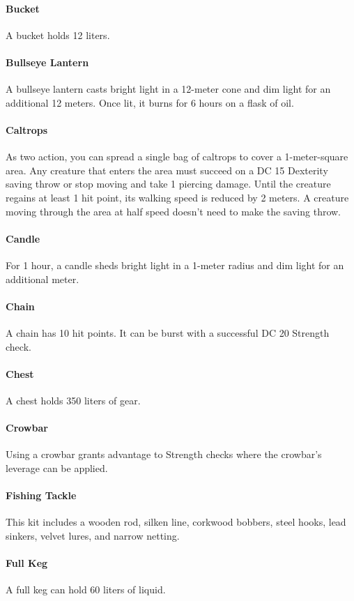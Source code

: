     \paragraph{Bucket}
        A bucket holds 12 liters.
    \paragraph{Bullseye Lantern}
        A bullseye lantern casts bright light in a 12-meter cone and dim light for an additional 12 meters.
        Once lit, it burns for 6 hours on a flask of oil.
    \paragraph{Caltrops}
        As two action, you can spread a single bag of caltrops to cover a 1-meter-square area.
        Any creature that enters the area must succeed on a DC 15 Dexterity saving throw or stop moving and take 1 piercing damage.
        Until the creature regains at least 1 hit point, its walking speed is reduced by 2 meters.
        A creature moving through the area at half speed doesn't need to make the saving throw.
    \paragraph{Candle}
        For 1 hour, a candle sheds bright light in a 1-meter radius and dim light for an additional meter.
    \paragraph{Chain}
        A chain has 10 hit points.
        It can be burst with a successful DC 20 Strength check.
    \paragraph{Chest}
        A chest holds 350 liters of gear.
    \paragraph{Crowbar}
        Using a crowbar grants advantage to Strength checks where the crowbar's leverage can be applied.
    \paragraph{Fishing Tackle}
        This kit includes a wooden rod, silken line, corkwood bobbers, steel hooks, lead sinkers, velvet lures, and narrow netting.
    \paragraph{Full Keg}
        A full keg can hold 60 liters of liquid.

